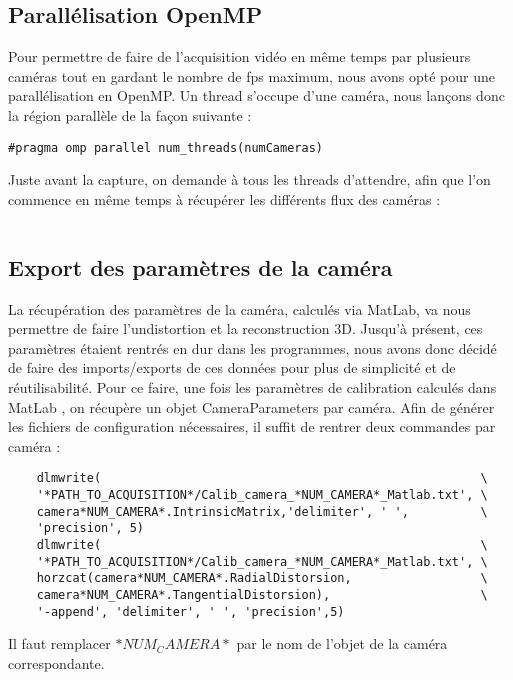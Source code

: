 \subsection{Parallélisation OpenMP}
Pour permettre de faire de l'acquisition vidéo en même temps par plusieurs caméras tout en gardant le nombre de fps maximum, nous avons opté pour une parallélisation en OpenMP. Un thread s'occupe d'une caméra, nous lançons donc la région parallèle de la façon suivante :
\begin{verbatim}
#pragma omp parallel num_threads(numCameras)
\end{verbatim}
Juste avant la capture, on demande à tous les threads d'attendre, afin que l'on commence en même temps à récupérer les différents flux des caméras :
\begin{verbatim}

\end{verbatim}


\subsection{Export des paramètres de la caméra}

La récupération des paramètres de la caméra, calculés via MatLab, va nous permettre de faire l'undistortion et la reconstruction 3D. Jusqu'à présent, ces paramètres étaient rentrés en dur dans les programmes, nous avons donc décidé de faire des imports/exports de ces données pour plus de simplicité et de réutilisabilité.
Pour ce faire, une fois les paramètres de calibration calculés dans MatLab , on récupère un objet CameraParameters par caméra. Afin de générer les fichiers de configuration nécessaires, il suffit de rentrer deux commandes par caméra :

\begin{verbatim}
	dlmwrite( 													  \
	'*PATH_TO_ACQUISITION*/Calib_camera_*NUM_CAMERA*_Matlab.txt', \
	camera*NUM_CAMERA*.IntrinsicMatrix,'delimiter', ' ',		  \
	'precision', 5)
	dlmwrite(													  \
	'*PATH_TO_ACQUISITION*/Calib_camera_*NUM_CAMERA*_Matlab.txt', \
	horzcat(camera*NUM_CAMERA*.RadialDistorsion,				  \
	camera*NUM_CAMERA*.TangentialDistorsion),					  \
	'-append', 'delimiter', ' ', 'precision',5)
\end{verbatim}

Il faut remplacer $*NUM_CAMERA*$ par le nom de l'objet de la caméra correspondante.